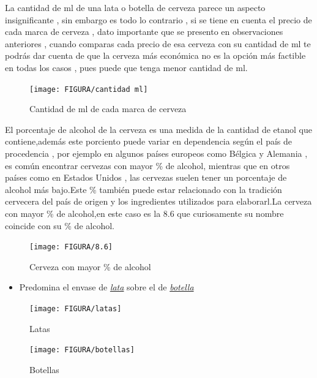 \documentclass[10pt]{beamer}
\begin{document}
   	\begin{frame}
   		La cantidad de ml de una lata o botella de cerveza parece un aspecto insignificante , sin embargo es todo lo contrario , si se tiene en cuenta el precio de cada marca de cerveza , dato importante que se presento en observaciones anteriores , cuando comparas cada precio de esa cerveza con su cantidad de ml te podrás dar cuenta de que la cerveza más económica no es la opción más factible en todas los casos , pues puede que tenga menor cantidad de ml.
   		
   		\begin{figure}
   			\centering
   			\texttt{[image: FIGURA/cantidad ml]}
   			\caption{Cantidad de ml de cada marca de cerveza}
   			\label{fig:cantidad-ml}
   		\end{figure}
   		
   	\end{frame}
   	
   	
   	\begin{frame}
   		El porcentaje de alcohol de la cerveza es una medida de la cantidad de etanol que contiene,además este porciento puede variar en dependencia según el país de procedencia , por ejemplo en algunos países europeos como Bélgica y Alemania , es común encontrar cervezas con mayor \% de alcohol, mientras que en otros países como en Estados Unidos , las cervezas suelen tener un porcentaje de alcohol más bajo.Este \% también puede estar relacionado con la tradición cervecera del país de origen y los ingredientes utilizados para elaborarl.La cerveza con mayor \% de alcohol,en este caso es la 8.6 que curiosamente su nombre coincide con su \% de alcohol.
   		
   		\begin{figure}
   			\centering
   			\texttt{[image: FIGURA/8.6]}
   			\caption{Cerveza con mayor \% de alcohol}
   			\label{fig:8}
   		\end{figure}
   		
   	\end{frame}
   	
   	
   	\begin{frame}
   		
   		\begin{itemize}
   			\item{Predomina el envase de \textit{\underline{lata}} sobre el de \textit{\underline{botella}}}
   		\end{itemize}
   		
   		\begin{figure}
   			\centering
   			\texttt{[image: FIGURA/latas]}
   			\caption{Latas}
   			\label{fig:latas}
   		\end{figure}
   		
   		
   		\begin{figure}
   			\centering
   			\texttt{[image: FIGURA/botellas]}
   			\caption{Botellas}
   			\label{fig:botellas}
   		\end{figure}
   		
   		
   	\end{frame}
   	
\end{document}
